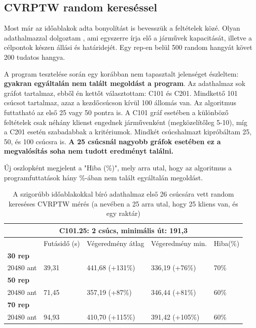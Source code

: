 \newpage
\newpage
\newpage
\newpage

\subsection{CVRPTW random kereséssel} \label{CVRPTW1section}
Most már az időablakok adta bonyolítást is bevesszük a feltételek közé. Olyan adathalmazzal dolgoztam \cite{VRPTWdataset}, ami egyszerre írja elő a járművek kapacitását, illetve a célpontok készen állási és határidejét. Egy rep-en belül 500 random hangyát követ 200 tudatos hangya.

 A program tesztelése során egy korábban nem tapasztalt jelenséget észleltem: \textbf{gyakran egyáltalán nem talált megoldást a program}.
Az adathalmaz sok gráfot tartalmaz, ebből én kettőt választottam: C101 és C201. Mindkettő 101 csúcsot tartalmaz, azaz a kezdőcsúcson kívül 100 állomás van. Az algoritmus futtatható az első 25 vagy 50 pontra is. A C101 gráf esetében a különböző feltételek csak néhány klienst engednek járművenként (megközelítőleg 5-10), míg a C201 esetén szabadabbak a kritériumok. Mindkét csúcshalmazt kipróbáltam 25, 50, és 100 csúcsra is. \textbf{A 25 csúcsnál nagyobb gráfok esetében ez a megvalósítás soha nem tudott eredményt találni.}

Új oszlopként megjelent a "Hiba (\%)", mely arra utal, hogy az algoritmus a programfuttatások hány \%-ában nem talált egyáltalán megoldást. 

\begin{table}[ht!]
	\centering
	\begin{tabular}{|p{1.75cm}||p{2cm}|p{3.25cm}|p{3.25cm}|p{1.5cm}|}
		\hline
		\multicolumn{5}{|c|}{C101.25: 2 csúcs, minimális út: 191,3} \\
		\hline
		& Futásidő (s) & Végeredmény átlag & Végeredmény min. & Hiba(\%) \\
		\hline
		\textbf{30 rep} &  &  &  &  \\
		20480 ant & 39,31 & 441,68 (+131\%) & 336,19 (+76\%) & 70\% \\
		\hline
		\textbf{50 rep} &  &  &  &  \\
		20480 ant & 71,45 & 357,19 (+87\%) & 346,44 (+81\%) & 60\% \\
		\hline
		\textbf{70 rep} &  &  &  &  \\
		20480 ant & 94,93 & 410,70 (+115\%) & 391,42 (+105\%) & 60\% \\
		\hline
	\end{tabular}
	\caption{A szigorúbb időablakokkal bíró adathalmaz első 26 csúcsára vett random kereséses CVRPTW mérés (a nevében a 25 arra utal, hogy 25 kliens van, és egy raktár)}
	\label{table:VRTPW_25_1}
\end{table}

